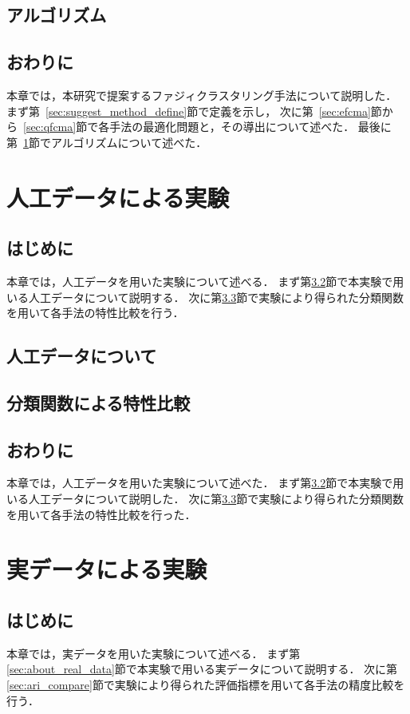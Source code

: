 \documentclass[a4j,12pt,dvipdfmx,oneside]{jsbook}
\theoremstyle{definition}
\begin{document}
\section{アルゴリズム}\label{sec:suggest_algorythm}
%
\section{おわりに}\label{sec:suggest_method_summary}
本章では，本研究で提案するファジィクラスタリング手法について説明した．
まず第~\ref{sec:suggest_method_define}節で定義を示し，
次に第~\ref{sec:efcma}節から~\ref{sec:qfcma}節で各手法の最適化問題と，その導出について述べた．
最後に第~\ref{sec:suggest_algorythm}節でアルゴリズムについて述べた．
%
%
%
\chapter{人工データによる実験}\label{chap:artificial_data}
%
\section{はじめに}\label{sec:artificial_data_intro}
本章では，人工データを用いた実験について述べる．
まず第\ref{sec:about_artificial_data}節で本実験で用いる人工データについて説明する．
次に第\ref{sec:classification_function}節で実験により得られた分類関数を用いて各手法の特性比較を行う．
%
\section{人工データについて}\label{sec:about_artificial_data}
%
\section{分類関数による特性比較}\label{sec:classification_function}
%
\section{おわりに}\label{sec:artificial_data_summary}
本章では，人工データを用いた実験について述べた．
まず第\ref{sec:about_artificial_data}節で本実験で用いる人工データについて説明した．
次に第\ref{sec:classification_function}節で実験により得られた分類関数を用いて各手法の特性比較を行った．
%
%
%
\chapter{実データによる実験}\label{chap:real_data}
%
\section{はじめに}\label{sec:real_data_intro}
本章では，実データを用いた実験について述べる．
まず第\ref{sec:about_real_data}節で本実験で用いる実データについて説明する．
次に第\ref{sec:ari_compare}節で実験により得られた評価指標を用いて各手法の精度比較を行う．
%
\end{document}

